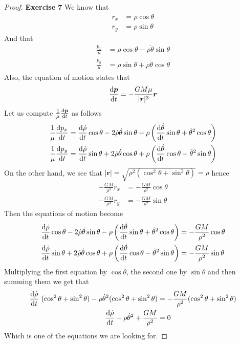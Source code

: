 \documentclass[11pt]{article}
\theoremstyle{definition}
\begin{document}
\begin{proof}{\textbf{Exercise 7}}
    We know that
    \begin{align*}
        r_x &= \rho\cos\theta\\
        r_y &= \rho\sin\theta
    \end{align*}
    And that
    \begin{align*}
        \frac{p_x}{\mu} &= \dot\rho\cos\theta - \rho\dot\theta\sin\theta\\
        \frac{p_y}{\mu} &= \dot\rho\sin\theta + \rho\dot\theta\cos\theta
    \end{align*}
    Also, the equation of motion states that
    $$\dv{\bm{p}}{t} = -\frac{GM\mu}{|\bm{r}|^3}\bm{r}$$
    Let us compute $\frac{1}{\mu}\dv{\bm{p}}{t}$ as follows
    \begin{align*}
        \frac{1}{\mu}\dv{p_x}{t} &= \dv{\dot\rho}{t}\cos\theta
        - 2\dot\rho\dot\theta\sin\theta
        - \rho\left(\dv{\dot\theta}{t}\sin\theta + \dot\theta^2\cos\theta\right)\\
        \frac{1}{\mu}\dv{p_y}{t} &= \dv{\dot\rho}{t}\sin\theta
        + 2\dot\rho\dot\theta\cos\theta
        + \rho\left(\dv{\dot\theta}{t}\cos\theta - \dot\theta^2\sin\theta\right)
    \end{align*}
    On the other hand, we see that
    $|\bm{r}| = \sqrt{\rho^2(\cos^2\theta + \sin^2\theta)} = \rho$
    hence
    \begin{align*}
        -\frac{GM}{\rho^3}r_x &= -\frac{GM}{\rho^2}\cos\theta\\
        -\frac{GM}{\rho^3}r_y &= -\frac{GM}{\rho^2}\sin\theta
    \end{align*}
    Then the equations of motion become
    \begin{align*}
        \dv{\dot\rho}{t}\cos\theta
        - 2\dot\rho\dot\theta\sin\theta
        - \rho\left(\dv{\dot\theta}{t}\sin\theta + \dot\theta^2\cos\theta\right)
        &= -\frac{GM}{\rho^2}\cos\theta\\
        \dv{\dot\rho}{t}\sin\theta
        + 2\dot\rho\dot\theta\cos\theta
        + \rho\left(\dv{\dot\theta}{t}\cos\theta - \dot\theta^2\sin\theta\right)
        &= -\frac{GM}{\rho^2}\sin\theta
    \end{align*}
    Multiplying the first equation by $\cos\theta$, the second one by
    $\sin\theta$ and then summing them we get that
    \begin{align*}
        \dv{\dot\rho}{t}~(\cos^2\theta + \sin^2\theta)
        - \rho\dot\theta^2(\cos^2\theta + \sin^2\theta)
       &= -\frac{GM}{\rho^2}(\cos^2\theta + \sin^2\theta)\\
       \dv{\dot\rho}{t} - \rho\dot\theta^2 + \frac{GM}{\rho^2} &= 0
   \end{align*}
    Which is one of the equations we are looking for.
    

\end{proof}
\end{document}
